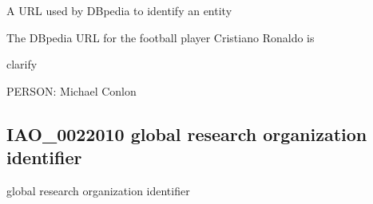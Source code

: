 \documentclass[letterpaper,10pt,english]{sphinxmanual}
\begin{document}
\begin{sphinxShadowBox}

\sphinxAtStartPar
A URL used by DBpedia to identify an entity
\end{sphinxShadowBox}

\begin{sphinxShadowBox}

\sphinxAtStartPar
{}
\end{sphinxShadowBox}

\begin{sphinxShadowBox}

\sphinxAtStartPar
The DBpedia URL for the football player Cristiano Ronaldo is 
\end{sphinxShadowBox}

\begin{sphinxShadowBox}

\sphinxAtStartPar
clarify
\end{sphinxShadowBox}

\begin{sphinxShadowBox}

\sphinxAtStartPar
{}
\end{sphinxShadowBox}

\begin{sphinxShadowBox}

\sphinxAtStartPar
PERSON: Michael Conlon
\end{sphinxShadowBox}
\begin{quote}

\ignorespaces \end{quote}


\subsection{IAO\_0022010 \sphinxhyphen{} global research organization identifier}
\label{\detokenize{doc-IAO_0022010:iao-0022010-global-research-organization-identifier}}\label{\detokenize{doc-IAO_0022010:index-0}}\label{\detokenize{doc-IAO_0022010::doc}}
\begin{sphinxShadowBox}

\sphinxAtStartPar
global research organization identifier
\end{sphinxShadowBox}
\end{document}
